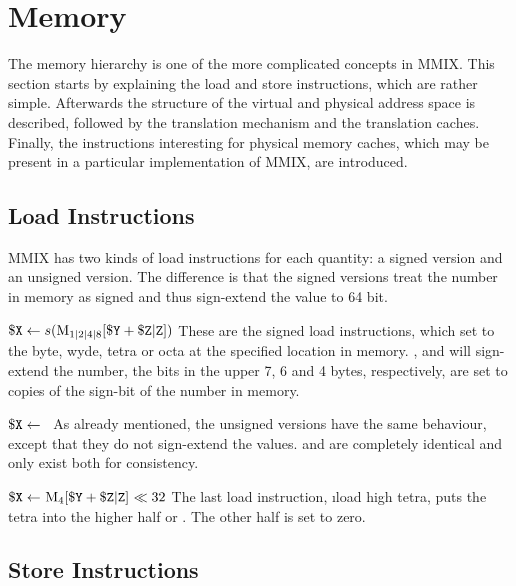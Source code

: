 \section{Memory}

The memory hierarchy is one of the more complicated concepts in MMIX. This section starts by explaining the load and store instructions, which are rather simple. Afterwards the structure of the virtual and physical address space is described, followed by the translation mechanism and the translation caches. Finally, the instructions interesting for physical memory caches, which may be present in a particular implementation of MMIX, are introduced.

\subsection{Load Instructions}

MMIX has two kinds of load instructions for each quantity: a signed version and an unsigned version. The difference is that the signed versions treat the number in memory as signed and thus sign-extend the value to 64 bit.

\instrtbl
	{}
	{$\dr{X} \leftarrow s(\vmem{1|2|4|8}{\dr{Y} + \udrim{Z}})$}
\noindent These are the signed load instructions, which set  to the byte, wyde, tetra or octa at the specified location in memory. ,  and  will sign-extend the number, \ie the bits in the upper 7, 6 and 4 bytes, respectively, are set to copies of the sign-bit of the number in memory. \citep[pg. 4]{mmix-doc}

\instrtbl
	{}
	{${\tt \$X} \leftarrow $~}
\noindent As already mentioned, the unsigned versions have the same behaviour, except that they do not sign-extend the values.  and  are completely identical and only exist both for consistency. \citep[pg. 4]{mmix-doc}

\instrtbl
	{}
	{$\dr{X} \leftarrow~\vmem{4}{\dr{Y} + \udrim{Z}}~\ll 32$}
\noindent The last load instruction, \i{load high tetra}, puts the tetra  into the higher half or . The other half is set to zero. \citep[pg. 4]{mmix-doc}

\subsection{Store Instructions}


